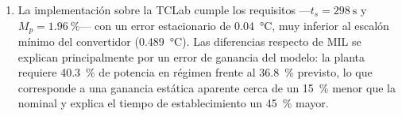 \begin{enumerate}[leftmargin=*]
\item La implementación sobre la TCLab cumple los requisitos ---$t_s = \SI{298}{\second}$ y
$M_p = \SI{1.96}{\percent}$--- con un error estacionario de \SI{0.04}{\celsius}, muy inferior al
escalón mínimo del convertidor (\SI{0.489}{\celsius}). Las diferencias respecto de MIL se explican
principalmente por un error de ganancia del modelo: la planta requiere \SI{40.3}{\percent} de
potencia en régimen frente al \SI{36.8}{\percent} previsto, lo que corresponde a una ganancia
estática aparente cerca de un \SI{15}{\percent} menor que la nominal y explica el tiempo de
establecimiento un \SI{45}{\percent} mayor.

\end{enumerate}
